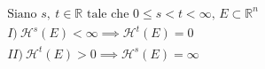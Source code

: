 \documentclass[preview]{standalone}
\begin{document}
\begin{align*}
\text{Siano } s,\ t \in  \mathbb{R} \text{ tale che } 0 \leq s < t < \infty, \, E \subset \mathbb{R}^n \\ I) \ \mathcal{H}^s(E) < \infty \implies \mathcal{H}^t(E) = 0 \\ II) \ \mathcal{H}^t(E) > 0 \implies \mathcal{H}^s(E) = \infty
\end{align*}
\end{document}
